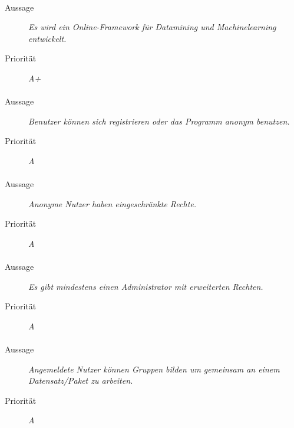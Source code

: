 \paragraph{}
\begin{description}
\item [Aussage] \textit{Es wird ein Online-Framework für Datamining und Machinelearning entwickelt.}
\item [Priorität] \textit{A+}
\end{description}

\paragraph{}
\begin{description}
\item [Aussage] \textit{Benutzer können sich registrieren oder das Programm anonym benutzen.}
\item [Priorität] \textit{A}
\end{description}

\paragraph{}
\begin{description}
\item[Aussage] \textit{Anonyme Nutzer haben eingeschränkte Rechte.}
\item[Priorität] \textit{A}
\end{description}

\paragraph{}
\begin{description}
\item[Aussage] \textit{Es gibt mindestens einen Administrator mit erweiterten Rechten.}
\item[Priorität] \textit{A}
\end{description}

\paragraph{}
\begin{description}
\item[Aussage] \textit{Angemeldete Nutzer können Gruppen bilden um gemeinsam an einem Datensatz/Paket zu arbeiten.}
\item[Priorität] \textit{A}
\end{description}

